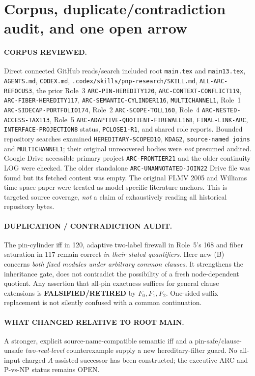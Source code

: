 \documentclass[11pt]{article}
\begin{document}
\section{Corpus, duplicate/contradiction audit, and one open arrow}
\paragraph{CORPUS REVIEWED.}
Direct connected GitHub reads/search included root
\texttt{main.tex} and \texttt{main13.tex},
\texttt{AGENTS.md}, \texttt{CODEX.md},
\texttt{.codex/skills/pnp-research/SKILL.md},
\texttt{ALL-ARC-REFOCUS3}, the prior Role~3
\texttt{ARC-PIN-HEREDITY120}, \texttt{ARC-CONTEXT-CONFLICT119},
\texttt{ARC-FIBER-HEREDITY117},
\texttt{ARC-SEMANTIC-CYLINDER116}, \texttt{MULTICHANNEL1},
Role~1 \texttt{ARC-SIDECAP-PORTFOLIO174},
Role~2 \texttt{ARC-SCOPE-TOLL160},
Role~4 \texttt{ARC-NESTED-ACCESS-TAX113},
Role~5 \texttt{ARC-ADAPTIVE-QUOTIENT-FIREWALL168},
\texttt{FINAL-LINK-ARC}, \texttt{INTERFACE-PROJECTION8}
status, \texttt{PCLOSE1-R1}, and shared role reports.
Bounded repository searches examined
\texttt{HEREDITARY-SCOPED10}, \texttt{KDAG2},
\texttt{source-named joins} and \texttt{MULTICHANNEL1};
their original unrecovered bodies were \emph{not} presumed audited.
Google Drive accessible primary project
\texttt{ARC-FRONTIER21} and the older continuity LOG
were checked. The older standalone
\texttt{ARC-UNANNOTATED-JOIN22} Drive file was found
but its fetched content was empty.
The original FLMV 2005 and Williams time-space paper
were treated as model-specific literature anchors.
This is targeted source coverage, \emph{not} a claim of
exhaustively reading all historical repository bytes.

\paragraph{DUPLICATION / CONTRADICTION AUDIT.}
The pin-cylinder iff in 120, adaptive two-label firewall in
Role~5's 168 and fiber saturation in 117 remain correct
\emph{in their stated quantifiers}. Here new (B) concerns
\emph{both fixed modules under arbitrary common clauses}.
It strengthens the inheritance gate, does not contradict
the possibility of a fresh node-dependent quotient.
Any assertion that all-pin exactness suffices for general
clause extensions is \textbf{FALSIFIED/RETIRED}
by $F_0,F_1,F_2$. One-sided suffix replacement is
not silently confused with a common continuation.

\paragraph{WHAT CHANGED RELATIVE TO ROOT MAIN.}
A stronger, explicit source-name-compatible semantic iff
and a pin-safe/clause-unsafe \emph{two-real-level}
counterexample supply a new hereditary-filter guard.
No all-input charged $A$-assisted successor has been constructed;
the executive ARC and P-vs-NP status remains OPEN.
\end{document}
